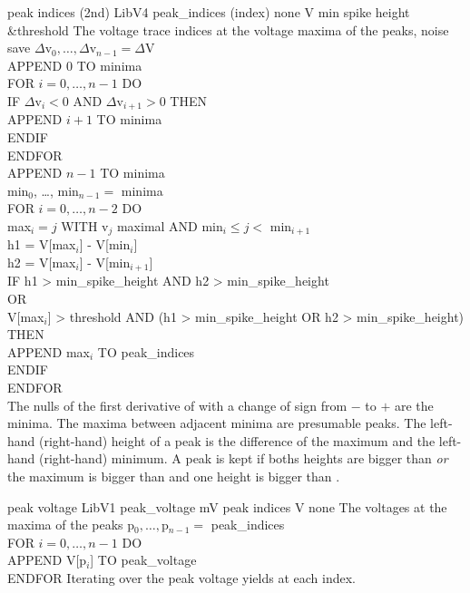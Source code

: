 \begin{efeature}
  {peak indices (2nd)}
  {LibV4}
  {peak\_indices}
  {(index)}
  {none}
  {V}
  {min spike height\\&threshold}
  {The voltage trace indices at the voltage maxima of the peaks, noise save}
  {
  $\Delta$v$_0, \ldots, \Delta$v$_{n-1} = \Delta$V \\
  APPEND $0$ TO minima \\
  FOR $i = 0, \dots, n - 1$ DO \+ \\
    IF $\Delta$v$_i < 0$ AND $\Delta$v$_{i+1} > 0$ THEN \+ \\
      APPEND $i + 1$ TO minima \- \\
    ENDIF \- \\
  ENDFOR \\
  APPEND $n - 1$ TO minima \\
  min$_0$, \ldots, min$_{n-1} =$ minima \\
  FOR $i = 0, \dots, n - 2$ DO \+ \\
    max$_i = j$ WITH v$_j$ maximal AND min$_i \le j < $ min$_{i+1}$ \\
    h1 = V[max$_i$] - V[min$_i$] \\
    h2 = V[max$_i$] - V[min$_{i+1}$] \\
    IF h1 > min\_spike\_height AND h2 > min\_spike\_height \\
    OR \\
    V[max$_i$] > threshold AND (h1 > min\_spike\_height OR h2 > min\_spike\_height) THEN \+ \\
      APPEND max$_i$ TO peak\_indices \- \\
    ENDIF \- \\
  ENDFOR \\
  }
  The nulls of the first derivative of  with a change of sign from $-$ to $+$ are the minima.
  The maxima between adjacent minima are presumable peaks.
  The left-hand (right-hand) height of a peak is the difference of the maximum and the left-hand (right-hand) minimum.
  A peak is kept if boths heights are bigger than  \emph{or} the maximum is bigger than  and one height is bigger than .
\end{efeature}

\begin{efeature}
  {peak voltage}
  {LibV1}
  {peak\_voltage}
  {mV}
  {peak indices}
  {V}
  {none}
  {The voltages at the maxima of the peaks}
  {
  p$_0, \ldots, $p$_{n-1} =$ peak\_indices \\
  FOR $i = 0, \dots, n - 1$ DO \+ \\
    APPEND V[p$_i$] TO peak\_voltage \- \\
  ENDFOR
  }
  Iterating over the  peak voltage yields  at each index.
  
\end{efeature}

